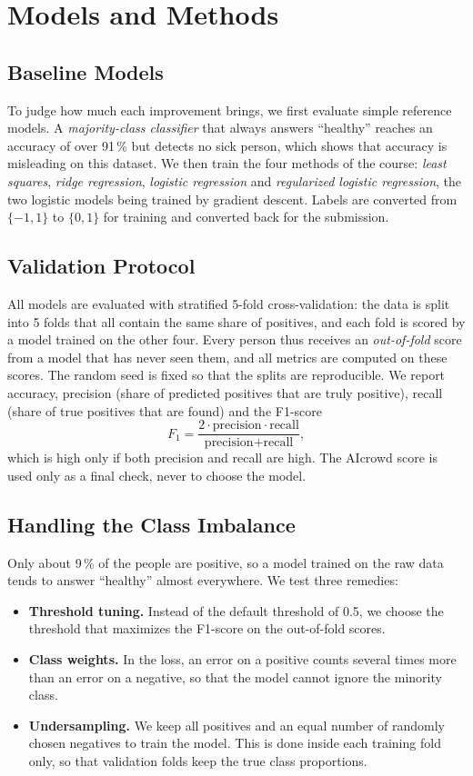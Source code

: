 \documentclass[10pt,conference,compsocconf]{IEEEtran}
\begin{document}
\section{Models and Methods}
 
 
\subsection{Baseline Models}
To judge how much each improvement brings, we first evaluate simple reference models. A \emph{majority-class classifier} that always answers ``healthy'' reaches an accuracy of over 91\,\% but detects no sick person, which shows that accuracy is misleading on this dataset. We then train the four methods of the course: \emph{least squares}, \emph{ridge regression}, \emph{logistic regression} and \emph{regularized logistic regression}, the two logistic models being trained by gradient descent. Labels are converted from $\{-1,1\}$ to $\{0,1\}$ for training and converted back for the submission.
 
\subsection{Validation Protocol}
All models are evaluated with stratified 5-fold cross-validation: the data is split into 5 folds that all contain the same share of positives, and each fold is scored by a model trained on the other four. Every person thus receives an \emph{out-of-fold} score from a model that has never seen them, and all metrics are computed on these scores. The random seed is fixed so that the splits are reproducible. We report accuracy, precision (share of predicted positives that are truly positive), recall (share of true positives that are found) and the F1-score
\begin{equation*}
F_1 = \frac{2\cdot \text{precision}\cdot \text{recall}}{\text{precision}+\text{recall}},
\end{equation*}
which is high only if both precision and recall are high. The AIcrowd score is used only as a final check, never to choose the model.
 
\subsection{Handling the Class Imbalance}
Only about 9\,\% of the people are positive, so a model trained on the raw data tends to answer ``healthy'' almost everywhere. We test three remedies:
\begin{itemize}\itemsep0pt
  \item \textbf{Threshold tuning.} Instead of the default threshold of 0.5, we choose the threshold that maximizes the F1-score on the out-of-fold scores.
  \item \textbf{Class weights.} In the loss, an error on a positive counts several times more than an error on a negative, so that the model cannot ignore the minority class.
  \item \textbf{Undersampling.} We keep all positives and an equal number of randomly chosen negatives to train the model. This is done inside each training fold only, so that validation folds keep the true class proportions.
\end{itemize}
 
\end{document}
